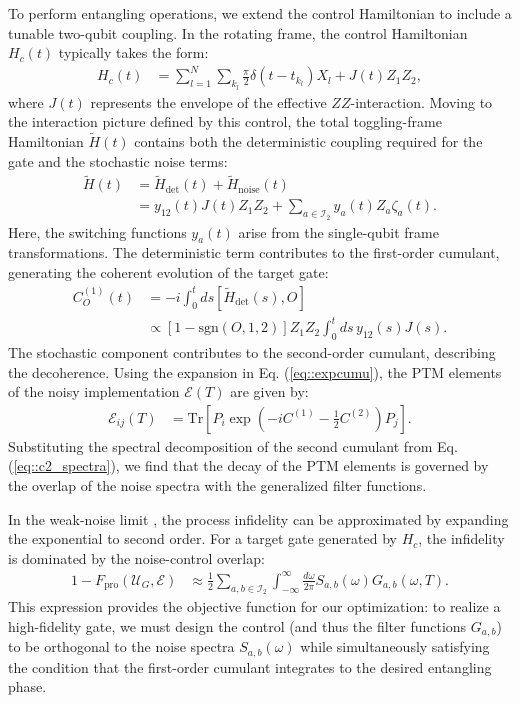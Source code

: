 \documentclass[%
 reprint,
superscriptaddress,
 amsmath,amssymb,
 aps,
pra,
]{revtex4-2}
\begin{document}
To perform entangling operations, we extend the control Hamiltonian to include a tunable two-qubit coupling. In the rotating frame, the control Hamiltonian $H_c(t)$ typically takes the form:
\begin{align}
\label{eq::CZHam}
    H_c(t) &= \sum_{l=1}^N \sum_{k_l} \frac{\pi}{2} \delta(t-t_{k_l}) X_l + J(t) Z_1 Z_2,
\end{align}
where $J(t)$ represents the envelope of the effective $ZZ$-interaction.
Moving to the interaction picture defined by this control, the total toggling-frame Hamiltonian $\tilde{H}(t)$ contains both the deterministic coupling required for the gate and the stochastic noise terms:
\begin{align}
    \tilde{H}(t) &= \tilde{H}_{\text{det}}(t) + \tilde{H}_{\text{noise}}(t) \nonumber \\
    &= y_{12}(t)J(t)Z_1Z_2 + \sum_{a \in \mathcal{I}_2} y_{a}(t) Z_a \zeta_{a}(t).
\end{align}
Here, the switching functions $y_a(t)$ arise from the single-qubit frame transformations. The deterministic term contributes to the first-order cumulant, generating the coherent evolution of the target gate:
\begin{align}
    C_{O}^{(1)}(t) &= -i \int_0^t ds \left[\tilde{H}_{\text{det}}(s), O\right] \nonumber \\
    &\propto [1-\text{sgn}(O,1,2)] Z_1 Z_2 \int_0^t ds \, y_{12}(s) J(s).
\end{align}
The stochastic component contributes to the second-order cumulant, describing the decoherence. Using the expansion in Eq. (\ref{eq::expcumu}), the PTM elements of the noisy implementation $\mathcal{E}(T)$ are given by:
\begin{align}
    \mathcal{E}_{ij}(T) &= \text{Tr}\left[P_i \exp\left( -iC^{(1)} - \frac{1}{2}C^{(2)} \right) P_j \right].
\end{align}
Substituting the spectral decomposition of the second cumulant from Eq. (\ref{eq::c2_spectra}), we find that the decay of the PTM elements is governed by the overlap of the noise spectra with the generalized filter functions.

In the weak-noise limit \cite{tsai_benchmarking_2024}, the process infidelity can be approximated by expanding the exponential to second order. For a target gate generated by $H_c$, the infidelity is dominated by the noise-control overlap:
\begin{align}
    1 - F_{\text{pro}}(\mathcal{U}_G, \mathcal{E}) &\approx \frac{1}{2} \sum_{a,b \in \mathcal{I}_2} \int_{-\infty}^{\infty} \frac{d\omega}{2\pi} S_{a,b}(\omega) G_{a,b}(\omega, T).
\end{align}
This expression provides the objective function for our optimization: to realize a high-fidelity gate, we must design the control (and thus the filter functions $G_{a,b}$) to be orthogonal to the noise spectra $S_{a,b}(\omega)$ while simultaneously satisfying the condition that the first-order cumulant integrates to the desired entangling phase.
\end{document}

